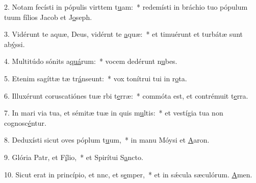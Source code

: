 2. Notam fecísti in pópulis virttem t\uline{u}am:~* redemísti in bráchio tuo pópulum tuum fílios Jacob et J\uline{o}seph.\par 
3. Vidérunt te aquæ, Deus, vidérnt te \uline{a}quæ:~* et timuérunt et turbátæ sunt ab\uline{ý}ssi.\par 
4. Multitúdo sónits a\uline{quá}rum:~* vocem dedérunt n\uline{u}bes.\par 
5. Etenim sagíttæ tæ tr\uline{á}nseunt:~* vox tonítrui tui in r\uline{o}ta.\par 
6. Illuxérunt coruscatiónes tuæ rbi t\uline{e}rræ:~* commóta est, et contrémuit t\uline{e}rra.\par 
7. In mari via tua, et sémitæ tuæ in quis m\uline{u}ltis:~* et vestígia tua non cognosc\uline{é}ntur.\par 
8. Deduxísti sicut oves póplum t\uline{u}um,~* in manu Móysi et \uline{A}aron.\par 
9. Glória Patr, et F\uline{í}lio,~* et Spirítui S\uline{a}ncto.\par 
10. Sicut erat in princípio, et nnc, et s\uline{e}mper,~* et in sǽcula sæculórum. \uline{A}men.\par 
